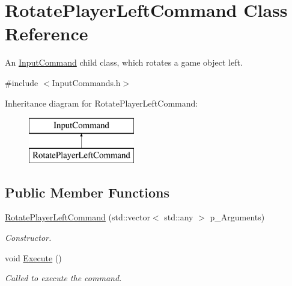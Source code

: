 \hypertarget{class_rotate_player_left_command}{}\section{Rotate\+Player\+Left\+Command Class Reference}
\label{class_rotate_player_left_command}


An \mbox{\hyperlink{class_input_command}{Input\+Command}} child class, which rotates a game object left.  




{\ttfamily \#include $<$Input\+Commands.\+h$>$}

Inheritance diagram for Rotate\+Player\+Left\+Command\+:\begin{figure}[H]
\begin{center}
\leavevmode
\includegraphics[height=2.000000cm]{class_rotate_player_left_command}
\end{center}
\end{figure}
\subsection*{Public Member Functions}
\begin{DoxyCompactItemize}
\item 
\mbox{\hyperlink{class_rotate_player_left_command_ac36dd4cd757c103f54c98dd8fff8f320}{Rotate\+Player\+Left\+Command}} (std\+::vector$<$ std\+::any $>$ p\+\_\+\+Arguments)
\begin{DoxyCompactList}\small\item\em Constructor. \end{DoxyCompactList}\item 
\mbox{\label{class_rotate_player_left_command_a7884619580dba971ea3c676ebfd4ce32}} 
void \mbox{\hyperlink{class_rotate_player_left_command_a7884619580dba971ea3c676ebfd4ce32}{Execute}} ()
\begin{DoxyCompactList}\small\item\em Called to execute the command. \end{DoxyCompactList}\end{DoxyCompactItemize}
